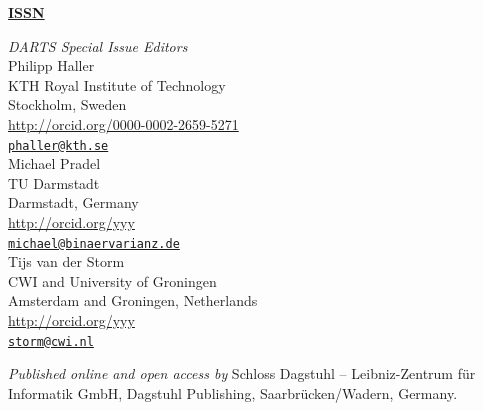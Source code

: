 \documentclass[a4paper,UKenglish]{dartsmaster}
\begin{document}
\frontmatter


\maketitle


\begin{publicationinfo}%
\sffamily
\twocolumn

{\Large\bf\sffamily \textbf{\href{http://www.dagstuhl.de/lites}{ISSN \printISSN{}}}}

\bigskip

\newcommand{\orcid}[1]{\url{http://orcid.org/#1}}
\newcommand{\email}[1]{\href{mailto:#1}{\texttt{#1}}}

\emph{DARTS Special Issue Editors} \\[0.2cm]
Philipp Haller\\
KTH Royal Institute of Technology\\
Stockholm, Sweden\\
\orcid{0000-0002-2659-5271}\\ %
\email{phaller@kth.se}\\

Michael Pradel\\
TU Darmstadt\\
Darmstadt, Germany\\
\orcid{yyy}\\ %
\email{michael@binaervarianz.de}\\

Tijs van der Storm\\
CWI and University of Groningen\\
Amsterdam and Groningen, Netherlands\\
\orcid{yyy}\\ %
\email{storm@cwi.nl}\\

\bigskip

\emph{Published online and open access by}\newline
Schloss Dagstuhl -- Leibniz-Zentrum f\"ur Informatik GmbH, Dagstuhl Publishing, Saarbr\"ucken/Wadern, Germany. 


\end{publicationinfo}
\end{document}
